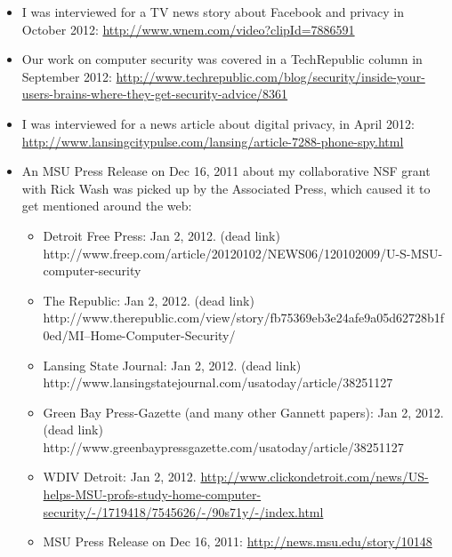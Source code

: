 \documentclass[9pt]{extarticle}
\begin{document}
\begin{itemize}
\item I was interviewed for a TV news story about Facebook and privacy in October 2012: \href{http://www.wnem.com/video?clipId=7886591}{http://www.wnem.com/video?clipId=7886591}
\item Our work on computer security was covered in a TechRepublic column in September 2012: \href{http://www.techrepublic.com/blog/security/inside-your-users-brains-where-they-get-security-advice/8361}{http://www.techrepublic.com/blog/security/inside-your-users-brains-where-they-get-security-advice/8361}
\item I was interviewed for a news article about digital privacy, in April 2012: \href{http://www.lansingcitypulse.com/lansing/article-7288-phone-spy.html}{http://www.lansingcitypulse.com/lansing/article-7288-phone-spy.html}
\item An MSU Press Release on Dec 16, 2011 about my collaborative NSF grant with Rick Wash was picked up by the Associated Press, which caused it to get mentioned around the web:
	\begin{itemize}
	\item Detroit Free Press: Jan 2, 2012. (dead link) http://www.freep.com/article/20120102/NEWS06/120102009/U-S-MSU-computer-security
	\item The Republic: Jan 2, 2012. (dead link) http://www.therepublic.com/view/story/fb75369eb3e24afe9a05d62728b1f0ed/MI--Home-Computer-Security/
	\item Lansing State Journal: Jan 2, 2012. (dead link) http://www.lansingstatejournal.com/usatoday/article/38251127
	\item Green Bay Press-Gazette (and many other Gannett papers): Jan 2, 2012. (dead link) http://www.greenbaypressgazette.com/usatoday/article/38251127
	\item WDIV Detroit: Jan 2, 2012. \href{http://www.clickondetroit.com/news/US-helps-MSU-profs-study-home-computer-security/-/1719418/7545626/-/90s71y/-/index.html}{http://www.clickondetroit.com/news/US-helps-MSU-profs-study-home-computer-security/-/1719418/7545626/-/90s71y/-/index.html}
	\item MSU Press Release on Dec 16, 2011: \href{http://news.msu.edu/story/10148}{http://news.msu.edu/story/10148}
	\end{itemize}
\end{itemize}
\end{document}
